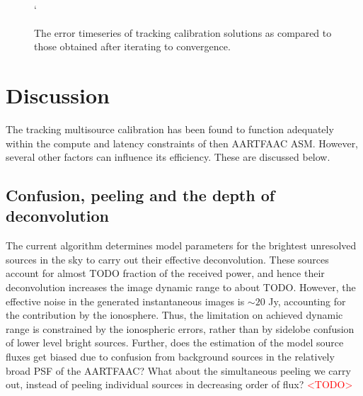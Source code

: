 \documentclass{aa}
\begin{document}
\begin{figure}[tbh]
`\caption{\label{fig:The-error-timeseries-1}The error timeseries of tracking
calibration solutions as compared to those obtained after iterating
to convergence. }
\end{figure}


\section{\label{sec:Discussion}Discussion}

The  tracking multisource  calibration  has been  found  to function  adequately
within  the compute  and  latency  constraints of  then  AARTFAAC ASM.  However,
several other factors can influence its efficiency. These are discussed below.


\subsection{\label{sub:Confusion,-peeling-and}Confusion, peeling and the depth
of deconvolution }

The current  algorithm determines model parameters for  the brightest unresolved
sources in  the sky to carry  out their effective  deconvolution.  These sources
account  for  almost  TODO fraction  of  the  received  power, and  hence  their
deconvolution  increases the  image dynamic  range to  about TODO.  However, the
effective noise in the generated instantaneous images is $\sim20$ Jy, accounting
for  the contribution  by  the  ionosphere.  Thus,  the  limitation on  achieved
dynamic range is constrained by  the ionospheric errors, rather than by sidelobe
confusion of  lower level  bright sources. Further,  does the estimation  of the
model source fluxes  get biased due to confusion from  background sources in the
relatively broad  PSF of  the AARTFAAC? What  about the simultaneous  peeling we
carry  out,  instead  of  peeling  individual sources  in  decreasing  order  of
flux?\textcolor{red}{{} <TODO> }
\end{document}
